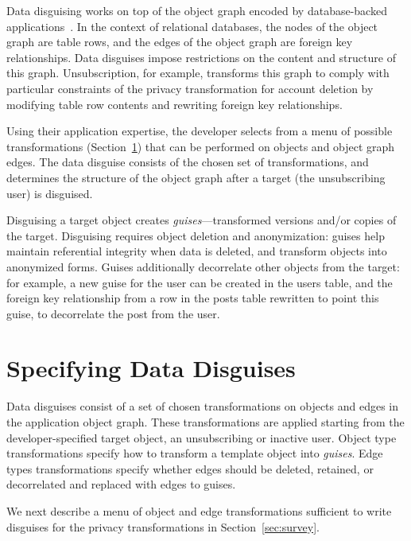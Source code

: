 Data disguising works on top of the object graph encoded by database-backed
applications~\cite{orm}. In the context of relational databases, the nodes of the object graph are
table rows, and the edges of the object graph are foreign key relationships. Data disguises impose
restrictions on the content and structure of this graph. Unsubscription, for example, transforms
this graph to comply with particular constraints of the privacy transformation for account deletion
by modifying table row contents and rewriting foreign key relationships.

Using their application expertise, the developer selects from a menu of possible transformations
(Section~\ref{sec:policies}) that can be performed on objects and object graph edges.
The data disguise consists of the chosen set of transformations, and determines the
structure of the object graph after a target (\eg the unsubscribing user) is disguised.

Disguising a target object creates \emph{guises}---transformed versions and/or copies of the target.
Disguising requires object deletion and anonymization: guises help maintain referential integrity
when data is deleted, and transform objects into anonymized forms.  Guises additionally decorrelate
other objects from the target: for example, a new guise for the user can be created in the users
table, and the foreign key relationship from a row in the posts table rewritten to point this guise,
to decorrelate the post from the user.

\section{Specifying Data Disguises}
\label{sec:policies}

Data disguises consist of a set of chosen transformations on objects and edges in the application
object graph.
These transformations are applied starting from the developer-specified target object, \eg an
unsubscribing or inactive user.
Object type transformations specify how to transform a template object into \emph{guises}.  Edge types
transformations specify whether edges should be deleted, retained, or decorrelated and replaced with
edges to guises.

We next describe a menu of object and edge transformations sufficient to write disguises for the
privacy transformations in Section~\ref{sec:survey}.

